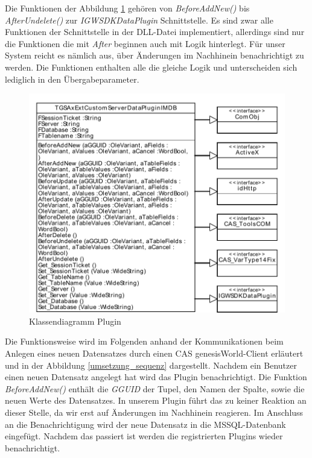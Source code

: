 Die Funktionen der Abbildung \ref{ergebniss_plugin_klassendiagramm} gehören von \textit{BeforeAddNew()} bis \textit{AfterUndelete()} zur \textit{IGWSDKDataPlugin} Schnittstelle. Es sind zwar alle Funktionen der Schnittstelle in der DLL-Datei implementiert, allerdings sind nur die Funktionen die mit \textit{After} beginnen auch mit Logik hinterlegt. Für unser System reicht es nämlich aus, über Änderungen im Nachhinein benachrichtigt zu werden. Die Funktionen enthalten alle die gleiche Logik und unterscheiden sich lediglich in den Übergabeparameter.

\begin{figure}[htbp]
\centering
\includegraphics[scale=0.7]{pics/plugin_klassendiagramm.pdf}
\caption{Klassendiagramm Plugin}
\label{ergebniss_plugin_klassendiagramm}
\end{figure}

Die Funktionsweise wird im Folgenden anhand der Kommunikationen beim Anlegen eines neuen Datensatzes durch einen CAS genesisWorld-Client erläutert und in der Abbildung \ref{umsetzung_sequenz} dargestellt. Nachdem ein Benutzer einen neuen Datensatz angelegt hat wird das Plugin benachrichtigt. Die Funktion \textit{BeforeAddNew()} enthält die \textit{GGUID} der Tupel, den Namen der Spalte, sowie die neuen Werte des Datensatzes. In unserem Plugin führt das zu keiner Reaktion an dieser Stelle, da wir erst auf Änderungen im Nachhinein reagieren. Im Anschluss an die Benachrichtigung wird der neue Datensatz in die MSSQL-Datenbank eingefügt. Nachdem das passiert ist werden die registrierten Plugins wieder benachrichtigt.

